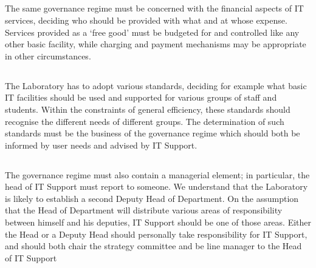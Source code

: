 \documentclass{article}
\begin{document}
\subsection{}
The same governance regime must be concerned with the financial aspects of IT services, deciding who should be provided with what and at whose expense. Services provided as a ‘free good’ must be budgeted for and controlled like any other basic facility, while charging and payment mechanisms may be appropriate in other circumstances.

\subsection{}
The Laboratory has to adopt various standards, deciding for example what basic IT facilities should be used and supported for various groups of staff and students. Within the constraints of general efficiency, these standards should recognise the different needs of different groups. The determination of such standards must be the business of the governance regime which should both be informed by user needs and advised by IT Support.

\subsection{}
The governance regime must also contain a managerial element; in particular, the head of IT Support must report to someone. We understand that the Laboratory is likely to establish a second Deputy Head of Department. On the assumption that the Head of Department will distribute various areas of responsibility between himself and his deputies, IT Support should be one of those areas. Either the Head or a Deputy Head should personally take responsibility for IT Support, and should both chair the strategy committee and be line manager to the Head of IT Support
\end{document}
